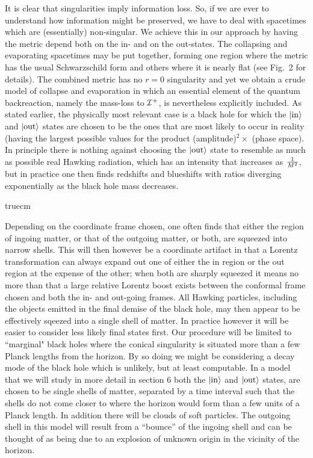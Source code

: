 It is clear that singularities imply information loss. So, if we are
ever to understand how information might be preserved, we have to deal
with spacetimes which are (essentially) non-singular. We achieve this
in our approach by having the metric depend both on the in- and on the
out-states. The collapsing and evaporating spacetimes may be put
together, forming one region where the metric has the usual
Schwarzschild form and others where it is nearly flat (see Fig.~2 for
details). The combined metric has no $r=0$ singularity and yet we
obtain a crude model of collapse and evaporation in which an essential
element of the quantum backreaction, namely the mass-loss to
$\cal{I}^+$, is nevertheless explicitly included.  As stated earlier,
the physically most relevant case is a black hole for which the
$\left|{\rm in}\right>$ and $\left|{\rm out}\right>$ states are chosen
to be the ones that are most likely to occur in reality (having the
largest possible values for the product
(amplitude)$^2 \times$ (phase space). In principle there is nothing
against choosing the $\left|{\rm out}\right>$ state to resemble as
much as possible real Hawking radiation, which has an intensity that
increases as $1\over M^2$, but in practice one then finds redshifts and
blueshifts with ratios diverging exponentially as the black hole mass
decreases.

\midinsert
{} truecm
\endinsert

Depending on the coordinate frame chosen, one often finds
that either the region of ingoing matter, or that of the outgoing
matter, or both, are squeezed into narrow shells. This will then
however be a coordinate artifact in that a Lorentz transformation can
always expand out one of  either the in region or the out region at
the expense of the other;  when both are sharply squeezed it means
no more than that a large relative Lorentz boost exists between the
conformal frame chosen and both the in- and out-going frames. All
Hawking particles, including the objects emitted in the final demise of
the black hole, may then appear to be effectively sqeezed into a
single shell of matter. In practice however it will be easier to
consider less likely final states first. Our procedure will be limited
to ``marginal" black holes where the conical singularity is situated
more than a few Planck lengths from the horizon. By so doing we might
be considering a decay mode of the black hole which is unlikely, but at
least computable. In a model that we will study in more detail in
section 6 both the $\left|{\rm in}\right>$ and $\left|{\rm out}\right>$
states, are chosen to be single shells of matter, separated by a time
interval such that the shells do not come closer to where the horizon
would form than a few units of a Planck length. In addition there will
be clouds of soft particles. The outgoing shell in this model will
result from a ``bounce'' of the ingoing shell and can be thought of as
being due to an explosion of unknown origin in the vicinity of the
horizon.

